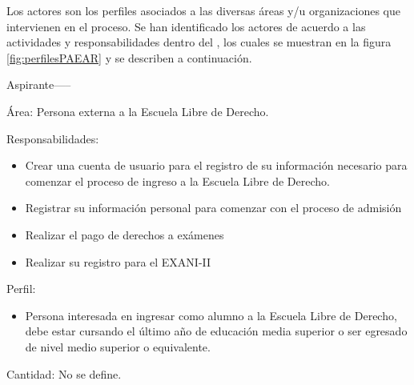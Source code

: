Los actores son los perfiles asociados a las diversas áreas y/u organizaciones que intervienen en el proceso. Se han identificado los actores de acuerdo a las actividades y responsabilidades dentro del \sae, los cuales se muestran en la figura \ref{fig:perfilesPAEAR} y se describen a continuación.


    \begin{actor}{Aspirante}{-----}

	\item[Área:] Persona externa a la Escuela Libre de Derecho.

	\item[Responsabilidades:] \hspace{1pt}
	
		\begin{itemize}
		    \item Crear una cuenta de usuario para el registro de su información necesario para comenzar el proceso de ingreso a la Escuela Libre de Derecho. 
		    \item Registrar su información personal para comenzar con el proceso de admisión
		    \item Realizar el pago de derechos a exámenes
		    \item Realizar su registro para el EXANI-II
		 \end{itemize}
	\item[Perfil:] \hspace{1pt}
		\begin{itemize}
		    \item Persona interesada en ingresar como alumno a la Escuela Libre de Derecho, debe estar cursando el último año de educación media superior o ser egresado de nivel medio superior o equivalente.
	    \end{itemize}
	\item[Cantidad:] No se define.
\end{actor}


